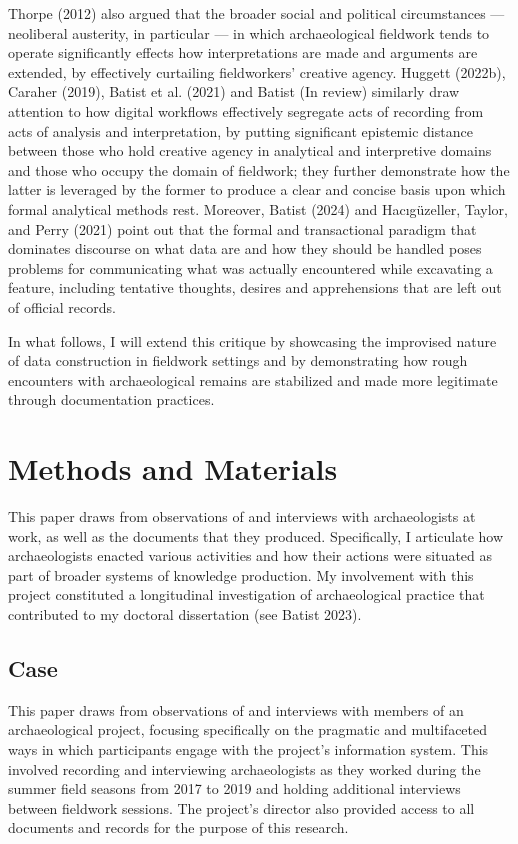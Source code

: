 \documentclass[
]{article}
\begin{document}
Thorpe (2012) also argued that the broader social and political
circumstances --- neoliberal austerity, in particular --- in which
archaeological fieldwork tends to operate significantly effects how
interpretations are made and arguments are extended, by effectively
curtailing fieldworkers' creative agency. Huggett (2022b), Caraher
(2019), Batist et al. (2021) and Batist (In review) similarly draw
attention to how digital workflows effectively segregate acts of
recording from acts of analysis and interpretation, by putting
significant epistemic distance between those who hold creative agency in
analytical and interpretive domains and those who occupy the domain of
fieldwork; they further demonstrate how the latter is leveraged by the
former to produce a clear and concise basis upon which formal analytical
methods rest. Moreover, Batist (2024) and Hacıgüzeller, Taylor, and
Perry (2021) point out that the formal and transactional paradigm that
dominates discourse on what data are and how they should be handled
poses problems for communicating what was actually encountered while
excavating a feature, including tentative thoughts, desires and
apprehensions that are left out of official records.

In what follows, I will extend this critique by showcasing the
improvised nature of data construction in fieldwork settings and by
demonstrating how rough encounters with archaeological remains are
stabilized and made more legitimate through documentation practices.

\section{Methods and Materials}\label{methods-and-materials}

This paper draws from observations of and interviews with archaeologists
at work, as well as the documents that they produced. Specifically, I
articulate how archaeologists enacted various activities and how their
actions were situated as part of broader systems of knowledge
production. My involvement with this project constituted a longitudinal
investigation of archaeological practice that contributed to my doctoral
dissertation (see Batist 2023).

\subsection{Case}\label{case}

This paper draws from observations of and interviews with members of an
archaeological project, focusing specifically on the pragmatic and
multifaceted ways in which participants engage with the project's
information system. This involved recording and interviewing
archaeologists as they worked during the summer field seasons from 2017
to 2019 and holding additional interviews between fieldwork sessions.
The project's director also provided access to all documents and records
for the purpose of this research.
\end{document}

